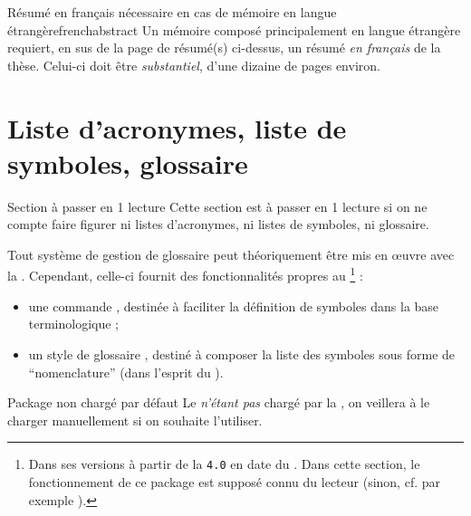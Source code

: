 \begin{dbwarning}{Résumé en français nécessaire en cas de mémoire en langue
    étrangère}{frenchabstract}
  Un mémoire composé principalement en langue étrangère  requiert, en sus de la page de
  résumé(s) ci-dessus, un résumé \emph{en français} de la thèse. Celui-ci doit
  être \emph{substantiel}, d'une dizaine de pages environ.
\end{dbwarning}

\section{Liste d'acronymes, liste de symboles,
  glossaire}\label{sec-sigl-gloss-nomencl}
%
%
%

\begin{dbremark*}{Section à passer en 1\iere{} lecture}
  Cette section est à passer en 1\iere{} lecture si on ne compte faire figurer
  ni listes d'acronymes, ni listes de symboles, ni glossaire.
\end{dbremark*}

Tout système de gestion de glossaire peut théoriquement être mis en œuvre avec
la \yatCl{}. Cependant, celle-ci fournit des fonctionnalités propres au
\footnote{Dans ses versions à partir de la \texttt{4.0} en
  date du . Dans cette section, le fonctionnement de ce
  package est supposé connu du lecteur (sinon, cf. par exemple
  \cite{en-ligne7}).} :
\begin{itemize}
\item une commande , destinée à faciliter la définition de
  symboles dans la base terminologique ;
\item un style de glossaire , destiné à composer la
  liste des symboles sous forme de \enquote{nomenclature} (dans l'esprit du
  ).
\end{itemize}

\begin{dbwarning}{Package  non chargé par défaut}{}
  Le  \emph{n'étant pas} chargé par la \yatCl{}, on veillera
  à le charger manuellement si on souhaite l'utiliser.
\end{dbwarning}


